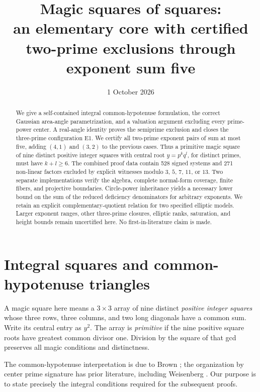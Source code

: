 \documentclass[11pt]{article}
\title{Magic squares of squares:\\an elementary core with certified\\two-prime exclusions through exponent sum five}
\author{}
\date{1 October 2026}
\theoremstyle{definition}\newtheorem{definition}[theorem]{Definition}
\theoremstyle{remark}\newtheorem{remark}[theorem]{Remark}
\begin{document}
\maketitle
\begin{abstract}
We give a self-contained integral common-hypotenuse formulation, the correct Gaussian area-angle parametrization, and a valuation argument excluding every prime-power center. A real-angle identity proves the semiprime exclusion and closes the three-prime configuration E1. We certify all two-prime exponent pairs of sum at most five, adding $(4,1)$ and $(3,2)$ to the previous cases. Thus a primitive magic square of nine distinct positive integer squares with central root $y=p^kq^l$, for distinct primes, must have $k+l\ge6$. The combined proof data contain 528 signed systems and 271 non-linear factors excluded by explicit witnesses modulo $3$, $5$, $7$, $11$, or $13$. Two separate implementations verify the algebra, complete normal-form coverage, finite fibers, and projective boundaries. Circle-power inheritance yields a necessary lower bound on the sum of the reduced deficiency denominators for arbitrary exponents. We retain an explicit complementary-quotient relation for two specified elliptic models. Larger exponent ranges, other three-prime closures, elliptic ranks, saturation, and height bounds remain uncertified here. No first-in-literature claim is made.
\end{abstract}

\section{Integral squares and common-hypotenuse triangles}\label{sec:dictionary}
A magic square here means a $3\times3$ array of nine distinct \emph{positive integer squares} whose three rows, three columns, and two long diagonals have a common sum. Write its central entry as $y^2$. The array is \emph{primitive} if the nine positive square roots have greatest common divisor one. Division by the square of that gcd preserves all magic conditions and distinctness.

The common-hypotenuse interpretation is due to Brown \cite{Brown511}; the organization by center prime signature has prior literature, including Weisenberg \cite{Weisenberg}. Our purpose is to state precisely the integral conditions required for the subsequent proofs.
\end{document}
